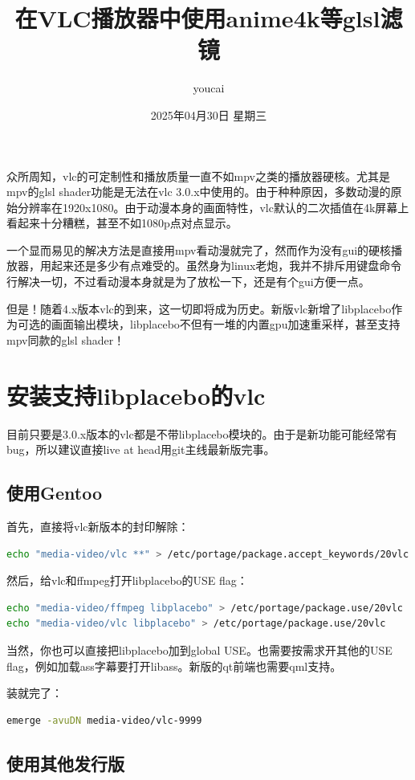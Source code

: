 \documentclass{article}
\title{在VLC播放器中使用anime4k等glsl滤镜}
\author{youcai}
\date{2025年04月30日 星期三}
\begin{document}
众所周知，vlc的可定制性和播放质量一直不如mpv之类的播放器硬核。尤其是mpv的glsl shader功能是无法在vlc 3.0.x中使用的。由于种种原因，多数动漫的原始分辨率在1920x1080。由于动漫本身的画面特性，vlc默认的二次插值在4k屏幕上看起来十分糟糕，甚至不如1080p点对点显示。

一个显而易见的解决方法是直接用mpv看动漫就完了，然而作为没有gui的硬核播放器，用起来还是多少有点难受的。虽然身为linux老炮，我并不排斥用键盘命令行解决一切，不过看动漫本身就是为了放松一下，还是有个gui方便一点。

但是！随着4.x版本vlc的到来，这一切即将成为历史。新版vlc新增了libplacebo作为可选的画面输出模块，libplacebo不但有一堆的内置gpu加速重采样，甚至支持mpv同款的glsl shader！

\section{安装支持libplacebo的vlc}

目前只要是3.0.x版本的vlc都是不带libplacebo模块的。由于是新功能可能经常有bug，所以建议直接live at head用git主线最新版完事。

\subsection{使用Gentoo}

首先，直接将vlc新版本的封印解除：

\begin{lstlisting}[language=bash]
echo "media-video/vlc **" > /etc/portage/package.accept_keywords/20vlc
\end{lstlisting}

然后，给vlc和ffmpeg打开libplacebo的USE flag：

\begin{lstlisting}[language=bash]
echo "media-video/ffmpeg libplacebo" > /etc/portage/package.use/20vlc
echo "media-video/vlc libplacebo" > /etc/portage/package.use/20vlc
\end{lstlisting}

当然，你也可以直接把libplacebo加到global USE。也需要按需求开其他的USE flag，例如加载ass字幕要打开libass。新版的qt前端也需要qml支持。

装就完了：

\begin{lstlisting}[language=bash]
emerge -avuDN media-video/vlc-9999
\end{lstlisting}

\subsection{使用其他发行版}
\end{document}
